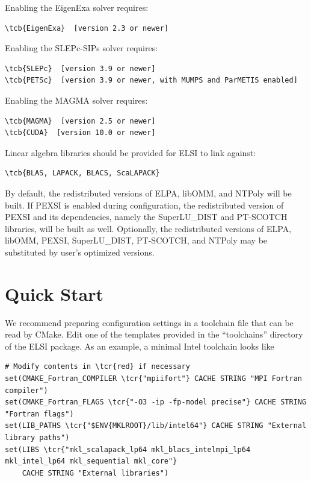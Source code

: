 \documentclass{report}
\newcommand{\tcb}[1]{\textcolor{blue}{#1}}
\newcommand{\tcr}[1]{\textcolor{red}{#1}}
\begin{document}
Enabling the EigenExa solver requires:
\begin{Verbatim}[commandchars=\\\{\}]
\tcb{EigenExa}  [version 2.3 or newer]
\end{Verbatim}

Enabling the SLEPc-SIPs solver requires:
\begin{Verbatim}[commandchars=\\\{\}]
\tcb{SLEPc}  [version 3.9 or newer]
\tcb{PETSc}  [version 3.9 or newer, with MUMPS and ParMETIS enabled]
\end{Verbatim}

Enabling the MAGMA solver requires:
\begin{Verbatim}[commandchars=\\\{\}]
\tcb{MAGMA}  [version 2.5 or newer]
\tcb{CUDA}  [version 10.0 or newer]
\end{Verbatim}

Linear algebra libraries should be provided for ELSI to link against:
\begin{Verbatim}[commandchars=\\\{\}]
\tcb{BLAS, LAPACK, BLACS, ScaLAPACK}
\end{Verbatim}

By default, the redistributed versions of ELPA, libOMM, and NTPoly will be built. If PEXSI is enabled during configuration, the redistributed version of PEXSI and its dependencies, namely the SuperLU\_DIST and PT-SCOTCH libraries, will be built as well. Optionally, the redistributed versions of ELPA, libOMM, PEXSI, SuperLU\_DIST, PT-SCOTCH, and NTPoly may be substituted by user's optimized versions.

\section{Quick Start}
\label{sec:quick}
We recommend preparing configuration settings in a toolchain file that can be read by CMake. Edit one of the templates provided in the ``toolchains'' directory of the ELSI package. As an example, a minimal Intel toolchain looks like
\begin{tcolorbox}
\begin{Verbatim}[commandchars=\\\{\}]
# Modify contents in \tcr{red} if necessary
set(CMAKE_Fortran_COMPILER \tcr{"mpiifort"} CACHE STRING "MPI Fortran compiler")
set(CMAKE_Fortran_FLAGS \tcr{"-O3 -ip -fp-model precise"} CACHE STRING "Fortran flags")
set(LIB_PATHS \tcr{"$ENV{MKLROOT}/lib/intel64"} CACHE STRING "External library paths")
set(LIBS \tcr{"mkl_scalapack_lp64 mkl_blacs_intelmpi_lp64 mkl_intel_lp64 mkl_sequential mkl_core"}
    CACHE STRING "External libraries")
\end{Verbatim}
\end{tcolorbox}
\end{document}
